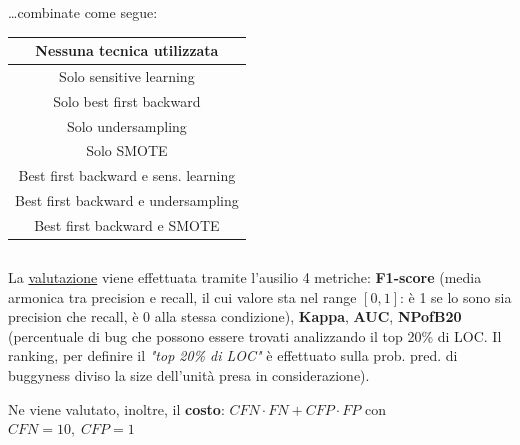 \documentclass{beamer}
\newcommand{\dflvspace}{\vspace{10pt}}
\begin{document}
\begin{frame}
\begin{columns}[T]
		\begin{column}{0.5\linewidth}
		\dots combinate come segue:
		\begin{tabular}{|c|}
			\hline
			Nessuna tecnica utilizzata\\
			\hline
			Solo sensitive learning\\
			\hline
			Solo best first backward\\
			\hline
			Solo undersampling\\
			\hline 
			Solo SMOTE\\
			\hline
			Best first backward e sens. learning\\
			\hline
			Best first backward e undersampling\\
			\hline
			Best first backward e SMOTE\\
			\hline
		\end{tabular}
		\end{column}
	\end{columns}
	\dflvspace
	La \underline{valutazione} viene effettuata tramite l'ausilio 4 metriche: 
	\textbf{F1-score} 
	(media armonica tra precision e recall, il cui valore sta nel range $[0,1]$: 
	è 1 se lo sono sia precision che recall, è 0 alla stessa condizione),
	\textbf{Kappa}, \textbf{AUC}, 
	\textbf{NPofB20} (percentuale di bug che
	possono essere trovati analizzando il top 20\% di LOC. Il ranking, per definire
	il \textit{"top 20\% di LOC"}
	è effettuato sulla prob. pred. di buggyness diviso la size dell'unità
	presa in considerazione).
	
	Ne viene valutato, inoltre, il \textbf{costo}: $CFN \cdot FN + CFP \cdot FP$ con
	$CFN=10,\;CFP=1$
\end{frame}
\end{document}
